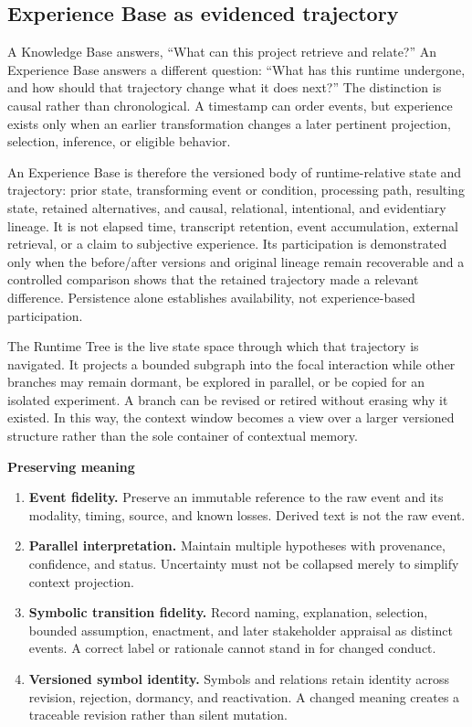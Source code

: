 \documentclass[10pt,a4paper]{article}
\begin{document}
\subsection{Experience Base as evidenced trajectory}

A Knowledge Base answers, ``What can this project retrieve and relate?'' An Experience Base answers a different question: ``What has this runtime undergone, and how should that trajectory change what it does next?'' The distinction is causal rather than chronological. A timestamp can order events, but experience exists only when an earlier transformation changes a later pertinent projection, selection, inference, or eligible behavior.

An Experience Base is therefore the versioned body of runtime-relative state and trajectory: prior state, transforming event or condition, processing path, resulting state, retained alternatives, and causal, relational, intentional, and evidentiary lineage. It is not elapsed time, transcript retention, event accumulation, external retrieval, or a claim to subjective experience. Its participation is demonstrated only when the before/after versions and original lineage remain recoverable and a controlled comparison shows that the retained trajectory made a relevant difference. Persistence alone establishes availability, not experience-based participation.

The Runtime Tree is the live state space through which that trajectory is navigated. It projects a bounded subgraph into the focal interaction while other branches may remain dormant, be explored in parallel, or be copied for an isolated experiment. A branch can be revised or retired without erasing why it existed. In this way, the context window becomes a view over a larger versioned structure rather than the sole container of contextual memory.

\noindent\textbf{Preserving meaning}
\begin{enumerate}
  \item \textbf{Event fidelity.} Preserve an immutable reference to the raw event and its modality, timing, source, and known losses. Derived text is not the raw event.
  \item \textbf{Parallel interpretation.} Maintain multiple hypotheses with provenance, confidence, and status. Uncertainty must not be collapsed merely to simplify context projection.
  \item \textbf{Symbolic transition fidelity.} Record naming, explanation, selection, bounded assumption, enactment, and later stakeholder appraisal as distinct events. A correct label or rationale cannot stand in for changed conduct.
  \item \textbf{Versioned symbol identity.} Symbols and relations retain identity across revision, rejection, dormancy, and reactivation. A changed meaning creates a traceable revision rather than silent mutation.
\end{enumerate}
\end{document}
